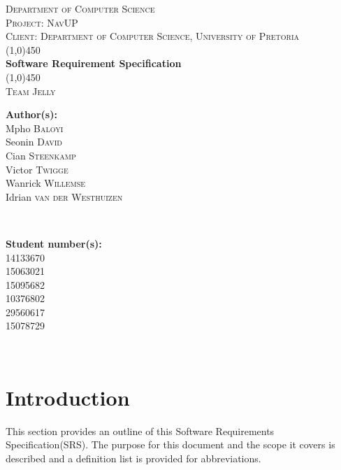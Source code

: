 \documentclass[a4paper,12pt]{article}
\begin{document}
\begin{titlepage}
\center


\textsc{\LARGE Department of Computer Science} \\ [.5cm]
\textsc{\Large Project: NavUP} \\ [.5cm]
\textsc{\Large Client: Department of Computer Science, University of Pretoria} \\ [.5cm]
\line(1,0){450}\\[.5cm]
\huge{\bfseries Software Requirement Specification}\\
\line(1,0){450}\\[.5cm]
\textsc{\LARGE Team Jelly}\\ [0.5cm]

\begin{minipage}{0.4\textwidth}
\begin{flushleft} \large
\textbf{Author(s):}\\
Mpho \textsc{Baloyi}\\
Seonin  \textsc{David}\\
Cian  \textsc{Steenkamp}\\
Victor \textsc{Twigge}\\
Wanrick  \textsc{Willemse}\\
Idrian  \textsc{van der Westhuizen}\\
\end{flushleft}
\end{minipage}
~
\begin{minipage}{0.4\textwidth}
\begin{flushright} \large
\textbf{Student number(s):} \\
14133670\\
15063021\\
15095682\\
10376802\\
29560617\\
15078729\\
\end{flushright}
\end{minipage}\\


\vfil

\end{titlepage}
\newpage
\tableofcontents
\newpage

\newpage
\section{Introduction}
This section provides an outline of this Software Requirements Specification(SRS). The purpose for this document and the scope it covers is described and a definition list is provided for abbreviations.
\end{document}
